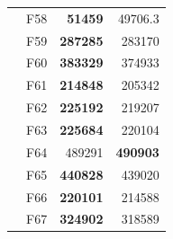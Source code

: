 \begin{table}[]
\begin{tabular}{ll|r|r|}
\multicolumn{1}{|l|}{\cellcolor[HTML]{ECF4FF}}                           & \cellcolor[HTML]{FCE6AB}F58     & \cellcolor[HTML]{D3FFB6}\textbf{51459}                         & 49706.3                                                   \\ \cline{2-4} 
\multicolumn{1}{|l|}{\cellcolor[HTML]{ECF4FF}}                           & \cellcolor[HTML]{FCE6AB}F59     & \cellcolor[HTML]{D3FFB6}\textbf{287285}                        & 283170                                                    \\ \cline{2-4} 
\multicolumn{1}{|l|}{\cellcolor[HTML]{ECF4FF}}                           & \cellcolor[HTML]{FCE6AB}F60     & \cellcolor[HTML]{D3FFB6}\textbf{383329}                        & 374933                                                    \\ \cline{2-4} 
\multicolumn{1}{|l|}{\cellcolor[HTML]{ECF4FF}}                           & \cellcolor[HTML]{FCE6AB}F61     & \cellcolor[HTML]{D3FFB6}\textbf{214848}                        & 205342                                                    \\ \cline{2-4} 
\multicolumn{1}{|l|}{\cellcolor[HTML]{ECF4FF}}                           & \cellcolor[HTML]{FCE6AB}F62     & \cellcolor[HTML]{D3FFB6}\textbf{225192}                        & 219207                                                    \\ \cline{2-4} 
\multicolumn{1}{|l|}{\cellcolor[HTML]{ECF4FF}}                           & \cellcolor[HTML]{FCE6AB}F63     & \cellcolor[HTML]{D3FFB6}\textbf{225684}                        & 220104                                                    \\ \cline{2-4} 
\multicolumn{1}{|l|}{\cellcolor[HTML]{ECF4FF}}                           & \cellcolor[HTML]{FCE6AB}F64     & 489291                                                         & \cellcolor[HTML]{D3FFB6}\textbf{490903}                   \\ \cline{2-4} 
\multicolumn{1}{|l|}{\cellcolor[HTML]{ECF4FF}}                           & \cellcolor[HTML]{FCE6AB}F65     & \cellcolor[HTML]{D3FFB6}\textbf{440828}                        & 439020                                                    \\ \cline{2-4} 
\multicolumn{1}{|l|}{\cellcolor[HTML]{ECF4FF}}                           & \cellcolor[HTML]{FCE6AB}F66     & \cellcolor[HTML]{D3FFB6}\textbf{220101}                        & 214588                                                    \\ \cline{2-4} 
\multicolumn{1}{|l|}{\cellcolor[HTML]{ECF4FF}}                           & \cellcolor[HTML]{FCE6AB}F67     & \cellcolor[HTML]{D3FFB6}\textbf{324902}                        & 318589                                                    \\ \cline{2-4} 

\end{tabular}
\end{table}
